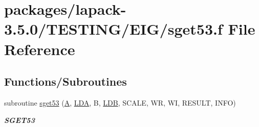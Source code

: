 \hypertarget{sget53_8f}{}\section{packages/lapack-\/3.5.0/\+T\+E\+S\+T\+I\+N\+G/\+E\+I\+G/sget53.f File Reference}
\label{sget53_8f}
\subsection*{Functions/\+Subroutines}
\begin{DoxyCompactItemize}
\item 
subroutine \hyperlink{group__single__eig_ga5fa2eab03c0b6a8a406b804107622c1f}{sget53} (\hyperlink{classA}{A}, \hyperlink{example__user_8c_ae946da542ce0db94dced19b2ecefd1aa}{L\+D\+A}, B, \hyperlink{example__user_8c_a50e90a7104df172b5a89a06c47fcca04}{L\+D\+B}, S\+C\+A\+L\+E, W\+R, W\+I, R\+E\+S\+U\+L\+T, I\+N\+F\+O)
\begin{DoxyCompactList}\small\item\em {\bfseries S\+G\+E\+T53} \end{DoxyCompactList}\end{DoxyCompactItemize}
